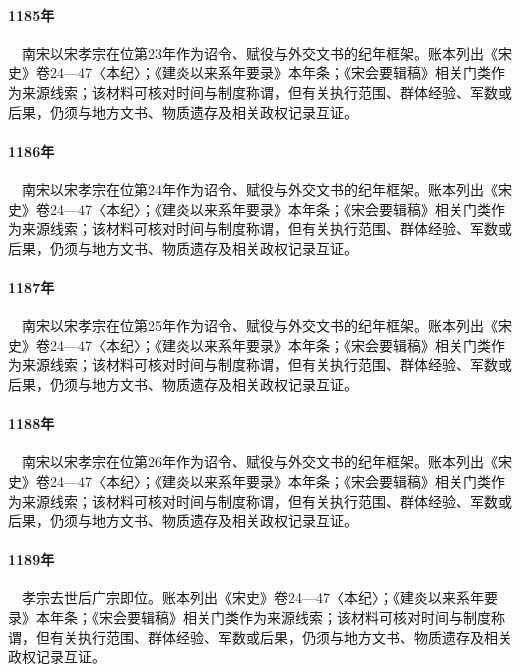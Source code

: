 \paragraph{1185年}　南宋以宋孝宗在位第23年作为诏令、赋役与外交文书的纪年框架。账本列出《宋史》卷24—47〈本纪〉；《建炎以来系年要录》本年条；《宋会要辑稿》相关门类作为来源线索；该材料可核对时间与制度称谓，但有关执行范围、群体经验、军数或后果，仍须与地方文书、物质遗存及相关政权记录互证。

\paragraph{1186年}　南宋以宋孝宗在位第24年作为诏令、赋役与外交文书的纪年框架。账本列出《宋史》卷24—47〈本纪〉；《建炎以来系年要录》本年条；《宋会要辑稿》相关门类作为来源线索；该材料可核对时间与制度称谓，但有关执行范围、群体经验、军数或后果，仍须与地方文书、物质遗存及相关政权记录互证。

\paragraph{1187年}　南宋以宋孝宗在位第25年作为诏令、赋役与外交文书的纪年框架。账本列出《宋史》卷24—47〈本纪〉；《建炎以来系年要录》本年条；《宋会要辑稿》相关门类作为来源线索；该材料可核对时间与制度称谓，但有关执行范围、群体经验、军数或后果，仍须与地方文书、物质遗存及相关政权记录互证。

\paragraph{1188年}　南宋以宋孝宗在位第26年作为诏令、赋役与外交文书的纪年框架。账本列出《宋史》卷24—47〈本纪〉；《建炎以来系年要录》本年条；《宋会要辑稿》相关门类作为来源线索；该材料可核对时间与制度称谓，但有关执行范围、群体经验、军数或后果，仍须与地方文书、物质遗存及相关政权记录互证。

\paragraph{1189年}　孝宗去世后广宗即位。账本列出《宋史》卷24—47〈本纪〉；《建炎以来系年要录》本年条；《宋会要辑稿》相关门类作为来源线索；该材料可核对时间与制度称谓，但有关执行范围、群体经验、军数或后果，仍须与地方文书、物质遗存及相关政权记录互证。


